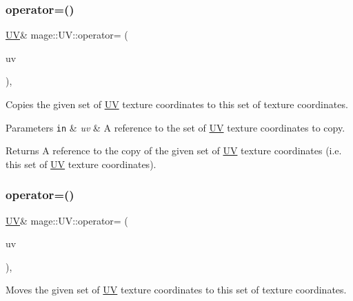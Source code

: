 \subsubsection{\texorpdfstring{operator=()}{operator=()}\hspace{0.1cm}{\footnotesize\ttfamily [1/2]}}
{\footnotesize\ttfamily \mbox{\hyperlink{structmage_1_1_u_v}{UV}}\& mage\+::\+U\+V\+::operator= (\begin{DoxyParamCaption}\item[{const \mbox{\hyperlink{structmage_1_1_u_v}{UV}} \&}]{uv }\end{DoxyParamCaption})\hspace{0.3cm}{\ttfamily [default]}, {\ttfamily [noexcept]}}

Copies the given set of \mbox{\hyperlink{structmage_1_1_u_v}{UV}} texture coordinates to this set of texture coordinates.


\begin{DoxyParams}[1]{Parameters}
\mbox{\tt in}  & {\em uv} & A reference to the set of \mbox{\hyperlink{structmage_1_1_u_v}{UV}} texture coordinates to copy. \\
\hline
\end{DoxyParams}
\begin{DoxyReturn}{Returns}
A reference to the copy of the given set of \mbox{\hyperlink{structmage_1_1_u_v}{UV}} texture coordinates (i.\+e. this set of \mbox{\hyperlink{structmage_1_1_u_v}{UV}} texture coordinates). 
\end{DoxyReturn}
\mbox{\label{structmage_1_1_u_v_ade2a86b1358b667df2bf20297bfae537}} 
\subsubsection{\texorpdfstring{operator=()}{operator=()}\hspace{0.1cm}{\footnotesize\ttfamily [2/2]}}
{\footnotesize\ttfamily \mbox{\hyperlink{structmage_1_1_u_v}{UV}}\& mage\+::\+U\+V\+::operator= (\begin{DoxyParamCaption}\item[{\mbox{\hyperlink{structmage_1_1_u_v}{UV}} \&\&}]{uv }\end{DoxyParamCaption})\hspace{0.3cm}{\ttfamily [default]}, {\ttfamily [noexcept]}}

Moves the given set of \mbox{\hyperlink{structmage_1_1_u_v}{UV}} texture coordinates to this set of texture coordinates.


